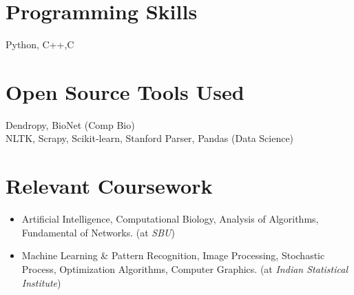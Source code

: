 \documentclass{res}
\begin{document}
\begin{resume}
\section{Programming Skills}
Python, C++,C

\section{\bf Open Source Tools Used}
Dendropy, BioNet  (Comp Bio) \\
NLTK, Scrapy, Scikit-learn, Stanford Parser, Pandas (Data Science) \\



\section{Relevant Coursework} 
\begin{itemize}
\item Artificial Intelligence,  Computational Biology, Analysis of Algorithms, Fundamental of Networks. (at {\it SBU})
\item Machine Learning \& Pattern Recognition, Image Processing, Stochastic Process, Optimization Algorithms, Computer Graphics. (at {\it
Indian Statistical Institute})
\end{itemize}



\end{resume}
\end{document}
